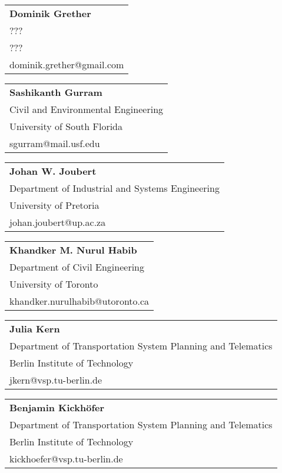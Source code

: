 \begin{tabular}[width=0.48\textwidth]{l}
\textbf{Dominik Grether} \\
??? \\
??? \\
dominik.grether@gmail.com \\
\end{tabular}

\begin{tabular}[width=0.48\textwidth]{l}
\textbf{Sashikanth Gurram} \\
Civil and Environmental Engineering \\
University of South Florida \\
sgurram@mail.usf.edu \\
\end{tabular}

\begin{tabular}[width=0.48\textwidth]{l}
\textbf{Johan W. Joubert} \\
Department of Industrial and Systems Engineering \\
University of Pretoria \\
johan.joubert@up.ac.za  \\
\end{tabular}

\begin{tabular}[width=0.48\textwidth]{l}
\textbf{Khandker M. Nurul Habib} \\
Department of Civil Engineering \\
University of Toronto \\
khandker.nurulhabib@utoronto.ca  \\
\end{tabular}

\begin{tabular}[width=0.48\textwidth]{l}
\textbf{Julia Kern} \\
Department of Transportation System Planning and Telematics \\
Berlin Institute of Technology \\
jkern@vsp.tu-berlin.de \\
\end{tabular}

\begin{tabular}[width=0.48\textwidth]{l}
\textbf{Benjamin Kickhöfer} \\
Department of Transportation System Planning and Telematics \\
Berlin Institute of Technology \\
kickhoefer@vsp.tu-berlin.de \\
\end{tabular}

